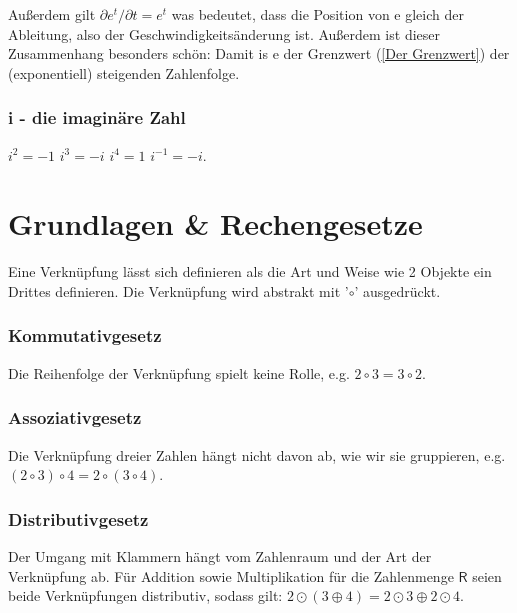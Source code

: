 \documentclass[letterpaper, titlepage]{article}
\begin{document}
\absatzformel
Außerdem gilt $\partial e^t/\partial t=e^t$ was bedeutet, dass die Position von e gleich der Ableitung, also der Geschwindigkeitsänderung ist. Außerdem ist dieser Zusammenhang  besonders schön: 
Damit is e der Grenzwert (\ref{Der Grenzwert}) der (exponentiell) steigenden Zahlenfolge.  

\subsubsection{i - die imaginäre Zahl}\label{i - die imaginäre Zahl}
\begin{center}
    
    $i^2=-1$
    \skiptwolines
    $i^3=-i$
    \skiptwolines
    $i^4=1$
    \skiptwolines
    $i^{-1}=-i$.
    \newline
\end{center}


\section{Grundlagen \& Rechengesetze}\label{Grundlegende Rechengesetze}
Eine Verknüpfung lässt sich definieren als die Art und Weise wie 2 Objekte ein Drittes definieren. Die Verknüpfung wird abstrakt mit '$\circ$' ausgedrückt.

\subsubsection{Kommutativgesetz}\label{Kommutativgesetz}
Die Reihenfolge der Verknüpfung spielt keine Rolle, e.g. $2\circ 3=3 \circ 2$. 

\subsubsection{Assoziativgesetz}\label{Assoziativgesetz}
Die Verknüpfung dreier Zahlen hängt nicht davon ab, wie wir sie gruppieren, e.g. $(2 \circ 3) \circ 4 = 2 \circ (3 \circ 4)$. 

\subsubsection{Distributivgesetz}\label{Distributivgesetz}
Der Umgang mit Klammern hängt vom Zahlenraum und der Art der Verknüpfung ab. Für Addition sowie Multiplikation für die Zahlenmenge $\mathsf{R}$ seien beide Verknüpfungen distributiv, sodass gilt: $2\odot (3\oplus 4)=2\odot 3\oplus 2\odot 4$. \hfill \break
\end{document}
